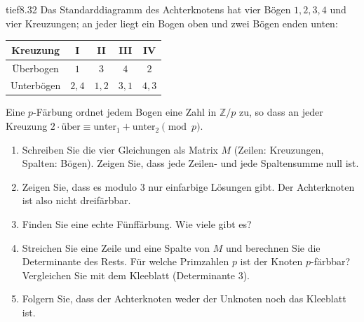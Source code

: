 \begin{karte}{tief}{8.32}{\typtypisch}{}
Das Standarddiagramm des Achterknotens hat vier Bögen $1, 2, 3, 4$ und vier Kreuzungen; an jeder liegt ein Bogen oben und zwei Bögen enden unten:
\begin{center}\small
\begin{tabular}{c|cccc}
Kreuzung & I & II & III & IV\\ \hline
Überbogen & $1$ & $3$ & $4$ & $2$\\
Unterbögen & $2, 4$ & $1, 2$ & $3, 1$ & $4, 3$
\end{tabular}
\end{center}
Eine $p$-Färbung ordnet jedem Bogen eine Zahl in $\mathbb Z/p$ zu, so dass an jeder Kreuzung $2\cdot\text{über}\equiv\text{unter}_1 + \text{unter}_2\pmod p$.
\begin{enumerate}[label=(\alph*),leftmargin=1.6em,itemsep=2pt]
\item Schreiben Sie die vier Gleichungen als Matrix $M$ (Zeilen: Kreuzungen, Spalten: Bögen). Zeigen Sie, dass jede Zeilen- und jede Spaltensumme null ist.
\item Zeigen Sie, dass es modulo $3$ nur einfarbige Lösungen gibt. Der Achterknoten ist also nicht dreifärbbar.
\item Finden Sie eine echte Fünffärbung. Wie viele gibt es?
\item Streichen Sie eine Zeile und eine Spalte von $M$ und berechnen Sie die Determinante des Rests. Für welche Primzahlen $p$ ist der Knoten $p$-färbbar? Vergleichen Sie mit dem Kleeblatt (Determinante $3$).
\item Folgern Sie, dass der Achterknoten weder der Unknoten noch das Kleeblatt ist.
\end{enumerate}
\end{karte}

